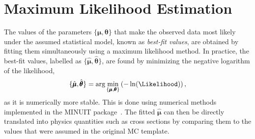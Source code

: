 
\section{Maximum Likelihood Estimation}
The values of the parameters $\{\pmb{\mu}, \pmb{\theta} \}$ that make the observed data most likely under the assumed statistical model, known as \emph{best-fit values}, are obtained by fitting them simultaneously using a maximum likelihood method.
In practice, the best-fit values, labelled as $\{\hat{\pmb{\mu}}, \hat{\pmb{\theta}} \}$, are found by minimizing the negative logarithm of the likelihood,
\begin{equation}
    \label{eq:best-fit-values}
    \{\hat{\pmb{\mu}}, \hat{\pmb{\theta}} \} = \text{arg} \min_{\{\pmb{\mu}, \pmb{\theta}\}} \left( - \ln (\Likelihood) \right),
\end{equation}
as it is numerically more stable. This is done using numerical methods implemented in the MINUIT package~\cite{James:1975dr}.
The fitted $\hat{\pmb{\mu}}$ can then be directly translated into physics quantities such as cross sections by comparing them to the values that were assumed in the original MC template.



